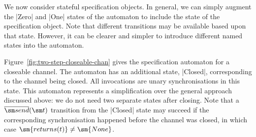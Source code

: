 
We now consider stateful specification objects.  In general, we can simply
augment the |Zero| and |One| states of the automaton to include the state of
the specification object.  Note that different transitions may be available
based upon that state.  
However, it can be clearer and simpler to introduce
different named states into the automaton.



Figure~\ref{fig:two-step-closeable-chan} gives the specification automaton for
a closeable channel.  The automaton has an additional state, |Closed|,
corresponding to the channel being closed.  All invocations are unary
synchronisations in this state.  This automaton represents a simplification
over the general approach discussed above: we do not need two separate states
after closing.  Note that a $\overline{\send}(\sm t)$ transition from the
|Closed| state may succeed if the corresponding synchronisation happened
before the channel was closed, in which case $\sm{returns(t)} \ne \sm{None}$.


